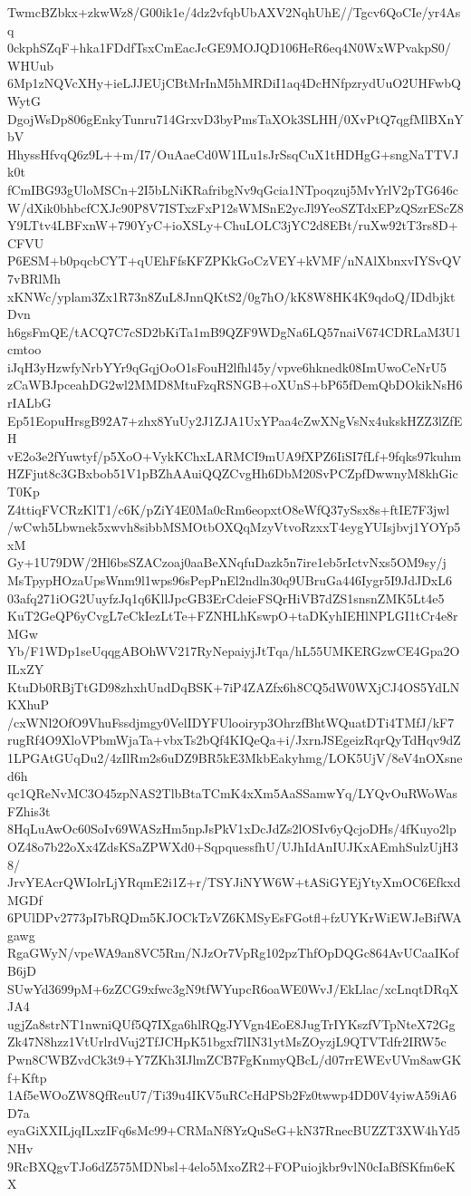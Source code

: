 TwmcBZbkx+zkwWz8/G00ik1e/4dz2vfqbUbAXV2NqhUhE//Tgcv6QoCIe/yr4Asq
0ckphSZqF+hka1FDdfTsxCmEacJcGE9MOJQD106HeR6eq4N0WxWPvakpS0/WHUub
6Mp1zNQVcXHy+ieLJJEUjCBtMrInM5hMRDiI1aq4DcHNfpzrydUuO2UHFwbQWytG
DgojWsDp806gEnkyTunru714GrxvD3byPmsTaXOk3SLHH/0XvPtQ7qgfMlBXnYbV
HhyssHfvqQ6z9L++m/I7/OuAaeCd0W1ILu1sJrSsqCuX1tHDHgG+sngNaTTVJk0t
fCmIBG93gUloMSCn+2I5bLNiKRafribgNv9qGcia1NTpoqzuj5MvYrlV2pTG646c
W/dXik0bhbcfCXJc90P8V7ISTxzFxP12sWMSnE2ycJl9YeoSZTdxEPzQSzrEScZ8
Y9LTtv4LBFxnW+790YyC+ioXSLy+ChuLOLC3jYC2d8EBt/ruXw92tT3rs8D+CFVU
P6ESM+b0pqcbCYT+qUEhFfsKFZPKkGoCzVEY+kVMF/nNAlXbnxvIYSvQV7vBRlMh
xKNWc/yplam3Zx1R73n8ZuL8JnnQKtS2/0g7hO/kK8W8HK4K9qdoQ/IDdbjktDvn
h6gsFmQE/tACQ7C7cSD2bKiTa1mB9QZF9WDgNa6LQ57naiV674CDRLaM3U1cmtoo
iJqH3yHzwfyNrbYYr9qGqjOoO1sFouH2lfhl45y/vpve6hknedk08ImUwoCeNrU5
zCaWBJpceahDG2wl2MMD8MtuFzqRSNGB+oXUnS+bP65fDemQbDOkikNsH6rIALbG
Ep51EopuHrsgB92A7+zhx8YuUy2J1ZJA1UxYPaa4cZwXNgVsNx4ukskHZZ3lZfEH
vE2o3e2fYuwtyf/p5XoO+VykKChxLARMCI9mUA9fXPZ6IiSI7fLf+9fqks97kuhm
HZFjut8c3GBxbob51V1pBZhAAuiQQZCvgHh6DbM20SvPCZpfDwwnyM8khGicT0Kp
Z4ttiqFVCRzKlT1/c6K/pZiY4E0Ma0cRm6eopxtO8eWfQ37ySsx8s+ftIE7F3jwl
/wCwh5Lbwnek5xwvh8sibbMSMOtbOXQqMzyVtvoRzxxT4eygYUIsjbvj1YOYp5xM
Gy+1U79DW/2Hl6bsSZACzoaj0aaBeXNqfuDazk5n7ire1eb5rIctvNxs5OM9sy/j
MsTpypHOzaUpsWnm9l1wps96sPepPnEl2ndln30q9UBruGa446Iygr5I9JdJDxL6
03afq271iOG2UuyfzJq1q6KllJpcGB3ErCdeieFSQrHiVB7dZS1snsnZMK5Lt4e5
KuT2GeQP6yCvgL7eCkIezLtTe+FZNHLhKswpO+taDKyhIEHlNPLGI1tCr4e8rMGw
Yb/F1WDp1seUqqgABOhWV217RyNepaiyjJtTqa/hL55UMKERGzwCE4Gpa2OILxZY
KtuDb0RBjTtGD98zhxhUndDqBSK+7iP4ZAZfx6h8CQ5dW0WXjCJ4OS5YdLNKXhuP
/cxWNl2OfO9VhuFssdjmgy0VelIDYFUlooiryp3OhrzfBhtWQuatDTi4TMfJ/kF7
rugRf4O9XloVPbmWjaTa+vbxTs2bQf4KIQeQa+i/JxrnJSEgeizRqrQyTdHqv9dZ
1LPGAtGUqDu2/4zIlRm2s6uDZ9BR5kE3MkbEakyhmg/LOK5UjV/8eV4nOXsned6h
qc1QReNvMC3O45zpNAS2TlbBtaTCmK4xXm5AaSSamwYq/LYQvOuRWoWasFZhis3t
8HqLuAwOc60SoIv69WASzHm5npJsPkV1xDcJdZs2lOSIv6yQcjoDHs/4fKuyo2lp
OZ48o7b22oXx4ZdsKSaZPWXd0+SqpquessfhU/UJhIdAnIUJKxAEmhSulzUjH38/
JrvYEAcrQWIolrLjYRqmE2i1Z+r/TSYJiNYW6W+tASiGYEjYtyXmOC6EfkxdMGDf
6PUlDPv2773pI7bRQDm5KJOCkTzVZ6KMSyEsFGotfl+fzUYKrWiEWJeBifWAgawg
RgaGWyN/vpeWA9an8VC5Rm/NJzOr7VpRg102pzThfOpDQGc864AvUCaaIKofB6jD
SUwYd3699pM+6zZCG9xfwc3gN9tfWYupcR6oaWE0WvJ/EkLlac/xcLnqtDRqXJA4
ugjZa8strNT1nwniQUf5Q7IXga6hlRQgJYVgn4EoE8JugTrIYKszfVTpNteX72Gg
Zk47N8hzz1VtUrlrdVuj2TfJCHpK51bgxf7lIN31ytMsZOyzjL9QTVTdfr2IRW5c
Pwn8CWBZvdCk3t9+Y7ZKh3IJlmZCB7FgKnmyQBcL/d07rrEWEvUVm8awGKf+Kftp
1Af5eWOoZW8QfReuU7/Ti39u4IKV5uRCcHdPSb2Fz0twwp4DD0V4yiwA59iA6D7a
eyaGiXXILjqILxzIFq6sMc99+CRMaNf8YzQuSeG+kN37RnecBUZZT3XW4hYd5NHv
9RcBXQgvTJo6dZ575MDNbsl+4elo5MxoZR2+FOPuiojkbr9vlN0cIaBfSKfm6eKX
